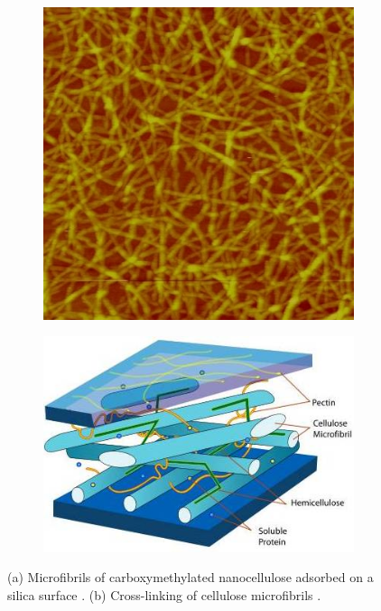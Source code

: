 \begin{figure}
\centering

\begin{subfigure}{.49\linewidth}
  \centering
  \includegraphics[width=.8\linewidth]{img/AFM_Innventia_nanocellulose}
  \caption{}
  \label{fig:cellulose}
\end{subfigure}
\begin{subfigure}{.49\linewidth}
  \centering
  \includegraphics[width=\linewidth]{img/crosslink}
  \caption{}
  \label{fig:crosslink}
\end{subfigure}%
\caption{(a) Microfibrils of carboxymethylated nanocellulose adsorbed on a silica surface \uncited. (b) Cross-linking of cellulose microfibrils \uncited.}
\end{figure}






